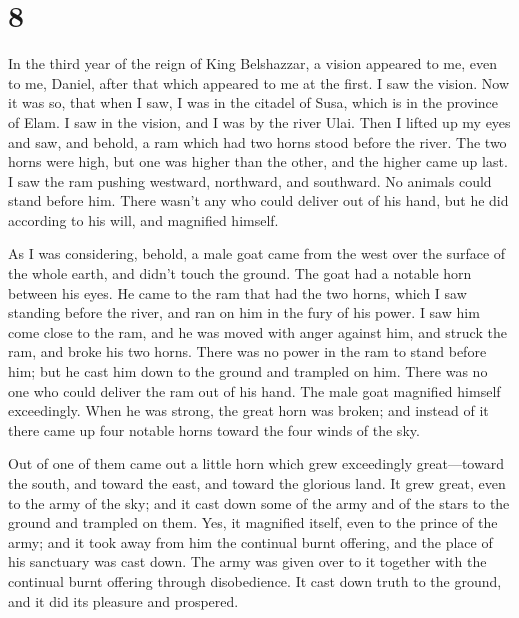 \hypertarget{section-7}{%
\section{8}\label{section-7}}

 In the third year of the reign of King Belshazzar, a
vision appeared to me, even to me, Daniel, after that which appeared to
me at the first.  I saw the vision. Now it was so, that
when I saw, I was in the citadel of Susa, which is in the province of
Elam. I saw in the vision, and I was by the river Ulai. 
Then I lifted up my eyes and saw, and behold, a ram which had two horns
stood before the river. The two horns were high, but one was higher than
the other, and the higher came up last.  I saw the ram
pushing westward, northward, and southward. No animals could stand
before him. There wasn't any who could deliver out of his hand, but he
did according to his will, and magnified himself.

 As I was considering, behold, a male goat came from the
west over the surface of the whole earth, and didn't touch the ground.
The goat had a notable horn between his eyes.  He came to
the ram that had the two horns, which I saw standing before the river,
and ran on him in the fury of his power.  I saw him come
close to the ram, and he was moved with anger against him, and struck
the ram, and broke his two horns. There was no power in the ram to stand
before him; but he cast him down to the ground and trampled on him.
There was no one who could deliver the ram out of his hand.
 The male goat magnified himself exceedingly. When he was
strong, the great horn was broken; and instead of it there came up four
notable horns toward the four winds of the sky.

 Out of one of them came out a little horn which grew
exceedingly great---toward the south, and toward the east, and toward
the glorious land.  It grew great, even to the army of
the sky; and it cast down some of the army and of the stars to the
ground and trampled on them.  Yes, it magnified itself,
even to the prince of the army; and it took away from him the continual
burnt offering, and the place of his sanctuary was cast down.
 The army was given over to it together with the
continual burnt offering through disobedience. It cast down truth to the
ground, and it did its pleasure and prospered.

